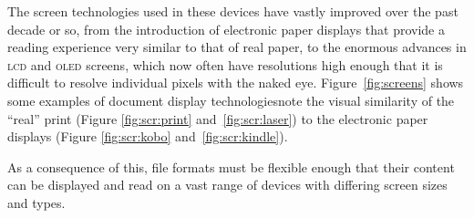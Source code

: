 The screen technologies used in these devices have vastly improved over the past decade or so, from the introduction of electronic paper displays that provide a reading experience very similar to that of real paper, to the enormous advances in \textsc{lcd} and \textsc{oled} screens, which now often have resolutions high enough that it is difficult to resolve individual pixels with the naked eye. Figure~\ref{fig:screens} shows some examples of document display technologies\ed note the visual similarity of the ``real'' print (Figure \ref{fig:scr:print} and~\ref{fig:scr:laser}) to the electronic paper displays (Figure \ref{fig:scr:kobo} and~\ref{fig:scr:kindle}).

As a consequence of this, \ebook{} file formats must be flexible enough that their content can be displayed and read on a vast range of devices with differing screen sizes and types.

